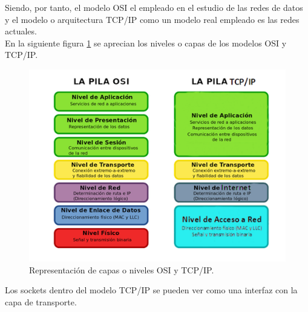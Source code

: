 Siendo, por tanto, el modelo OSI el empleado en el estudio de las redes de datos y el modelo o arquitectura TCP/IP como un modelo real
empleado es las redes actuales.\\

En la siguiente figura \ref{diagram:modelo-osi-tcp} se aprecian los niveles o capas de los modelos OSI y TCP/IP.\\

\begin{figure}[H]
  \begin{center}
    \includegraphics[scale=0.8]{imagenes/osi-tcp.png}
  \end{center}
  \caption{ Representación de capas o niveles OSI y TCP/IP.}
  \label{diagram:modelo-osi-tcp}
\end{figure}

Los sockets dentro del modelo TCP/IP se pueden ver como una interfaz con la capa de transporte.

